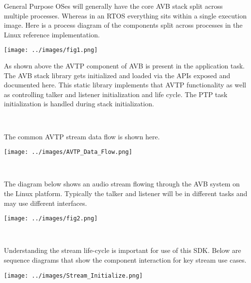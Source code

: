 General Purpose O\+Ses will generally have the core A\+VB stack split across multiple processes. Whereas in an R\+T\+OS everything sits within a single execution image. Here is a process diagram of the components split across processes in the Linux reference implementation.


\begin{DoxyImage}
\texttt{[image: ../images/fig1.png]}
\caption{A\+VB Components}
\end{DoxyImage}


As shown above the A\+V\+TP component of A\+VB is present in the application task. The A\+VB stack library gets initialized and loaded via the A\+P\+Is exposed and documented here. This static library implements that A\+V\+TP functionality as well as controlling talker and listener initialization and life cycle. The P\+TP task initialization is handled during stack initialization.

~\newline


The common A\+V\+TP stream data flow is shown here.


\begin{DoxyImage}
\texttt{[image: ../images/AVTP\_Data\_Flow.png]}
\caption{A\+V\+PT Data Flow}
\end{DoxyImage}


~\newline


The diagram below shows an audio stream flowing through the A\+VB system on the Linux platform. Typically the talker and listener will be in different tasks and may use different interfaces.


\begin{DoxyImage}
\texttt{[image: ../images/fig2.png]}
\caption{A\+VB Audio Stream Flow}
\end{DoxyImage}


~\newline


Understanding the stream life-\/cycle is important for use of this S\+DK. Below are sequence diagrams that show the component interaction for key stream use cases.


\begin{DoxyImage}
\texttt{[image: ../images/Stream\_Initialize.png]}
\caption{Stream Initialization}
\end{DoxyImage}


~\newline



